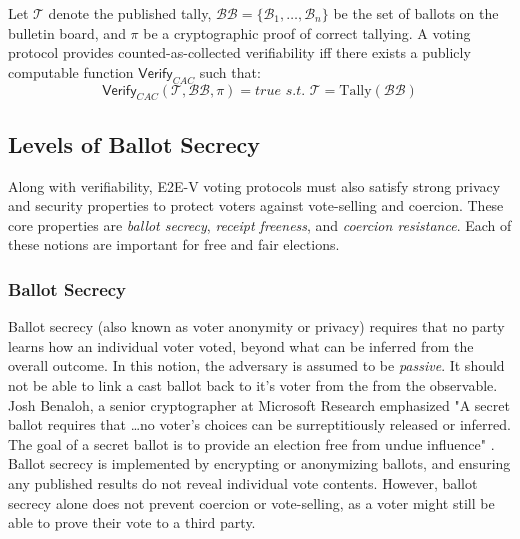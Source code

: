 \begin{definition}
Let $\mathcal{T}$ denote the published tally, $\mathcal{BB} = \{\mathcal{B}_1, \ldots, \mathcal{B}_n\}$ be the set of ballots on the bulletin board, and $\pi$ be a cryptographic proof of correct tallying. 
A voting protocol provides counted-as-collected verifiability iff there exists a publicly computable function $\mathsf{Verify}_{CAC}$ such that:
\begin{equation*}
\mathsf{Verify}_{CAC}(\mathcal{T}, \mathcal{BB}, \pi) = true \,\, s.t. \,\,\mathcal{T} = \text{Tally}(\mathcal{BB})
\end{equation*}
\end{definition}

\subsection{Levels of Ballot Secrecy}

Along with verifiability, E2E-V voting protocols must also satisfy strong privacy and security properties to protect voters against vote-selling and coercion.
These core properties are \emph{ballot secrecy}, \emph{receipt freeness}, and \emph{coercion resistance}.
Each of these notions are important for free and fair elections. 

\subsubsection{Ballot Secrecy}
Ballot secrecy (also known as voter anonymity or privacy) requires that no party learns how an individual voter voted, beyond what can be inferred from the overall outcome.
In this notion, the adversary is assumed to be \emph{passive}. 
It should not be able to link a cast ballot back to it's voter from the from the observable.
Josh Benaloh, a senior cryptographer at Microsoft Research emphasized "A secret ballot requires that \dots no voter's choices can be surreptitiously released or inferred. The goal of a secret ballot is to provide an election free from undue influence" \cite{Ben06}.
Ballot secrecy is implemented by encrypting or anonymizing ballots, and ensuring any published results do not reveal individual vote contents.
However, ballot secrecy alone does not prevent coercion or vote-selling, as a voter might still be able to prove their vote to a third party. 

